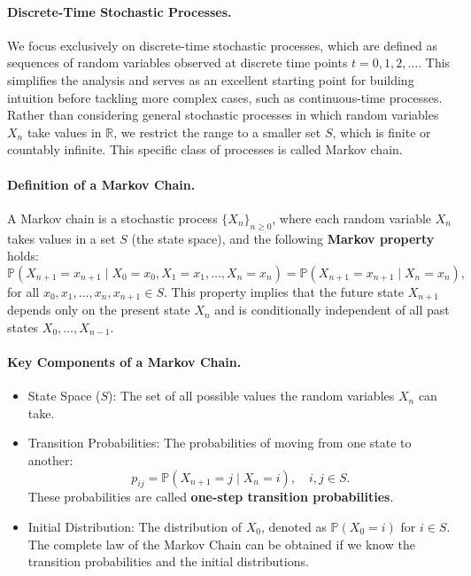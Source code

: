 \paragraph{Discrete-Time Stochastic Processes.}
We focus exclusively on discrete-time stochastic processes, which are defined as sequences of random variables observed at discrete time points \( t = 0, 1, 2, \dots \). This simplifies the analysis and serves as an excellent starting point for building intuition before tackling more complex cases, such as continuous-time processes. \newline
Rather than considering general stochastic processes in which random variables \( X_n \) take values in \( \mathbb{R} \), we restrict the range to a smaller set \( S \), which is finite or countably infinite. This specific class of processes is called Markov chain.

\paragraph{Definition of a Markov Chain.}
A Markov chain is a stochastic process \( \{X_n\}_{n \geq 0} \), where each random variable \( X_n \) takes values in a set \( S \) (the state space), and the following \textbf{Markov property} holds:
\[
\mathbb{P}(X_{n+1} = x_{n+1} \mid X_0 = x_0, X_1 = x_1, \dots, X_n = x_n) = \mathbb{P}(X_{n+1} = x_{n+1} \mid X_n = x_n),
\]
for all \( x_0, x_1, \dots, x_n, x_{n+1} \in S \). \newline
This property implies that the future state \( X_{n+1} \) depends only on the present state \( X_n \) and is conditionally independent of all past states \( X_0, \dots, X_{n-1} \).

\paragraph{Key Components of a Markov Chain.}
\begin{itemize}
    \item State Space (\( S \)): The set of all possible values the random variables \( X_n \) can take.
    \item Transition Probabilities: The probabilities of moving from one state to another:
  \[
  p_{ij} = \mathbb{P}(X_{n+1} = j \mid X_n = i), \quad i, j \in S.
  \]
  These probabilities are called \textbf{one-step transition probabilities}.
    \item Initial Distribution: The distribution of \( X_0 \), denoted as \( \mathbb{P}(X_0 = i) \) for \( i \in S \). The complete law of the Markov Chain can be obtained if we know the transition probabilities and the initial distributions.
\end{itemize}


